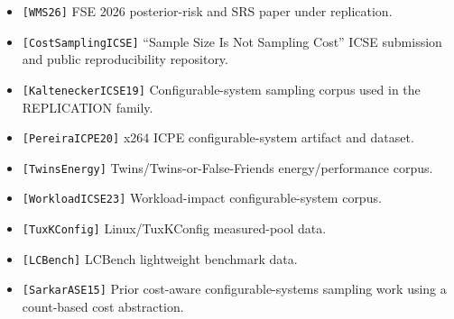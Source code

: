 \documentclass[smallcondensed]{svjour3}
\providecommand{\tightlist}{%
  \setlength{\itemsep}{0pt}\setlength{\parskip}{0pt}}
\begin{document}
\begin{itemize}
\tightlist
\item
  \texttt{{[}WMS26{]}} FSE 2026 posterior-risk and SRS paper under
  replication.
\item
  \texttt{{[}CostSamplingICSE{]}} ``Sample Size Is Not Sampling Cost''
  ICSE submission and public reproducibility repository.
\item
  \texttt{{[}KalteneckerICSE19{]}} Configurable-system sampling corpus
  used in the REPLICATION family.
\item
  \texttt{{[}PereiraICPE20{]}} x264 ICPE configurable-system artifact
  and dataset.
\item
  \texttt{{[}TwinsEnergy{]}} Twins/Twins-or-False-Friends
  energy/performance corpus.
\item
  \texttt{{[}WorkloadICSE23{]}} Workload-impact configurable-system
  corpus.
\item
  \texttt{{[}TuxKConfig{]}} Linux/TuxKConfig measured-pool data.
\item
  \texttt{{[}LCBench{]}} LCBench lightweight benchmark data.
\item
  \texttt{{[}SarkarASE15{]}} Prior cost-aware configurable-systems
  sampling work using a count-based cost abstraction.
\end{itemize}
\end{document}
